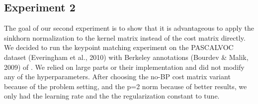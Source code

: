 \subsection{Experiment 2}

The goal of our second experiment is to show that it is advantageous to apply the sinkhorn normalization to the kernel matrix instead of the cost matrix directly. We decided to run the keypoint matching experiment on the PASCALVOC  dataset (Everingham et al., 2010) with Berkeley annotations (Bourdev \& Malik, 2009) of \cite{fey2020_update}. We relied on large parts or their implementation and did not modify any of the hyperparameters. After choosing the no-BP cost matrix variant because of the problem setting, and the p=2 norm because of better results, we only had the learning rate and the the regularization constant to tune.








\begin{table}[ht]
    \centering
    \caption{Hits@1 (\%) on the PASCALVOC dataset with Berkeley keypoint annotations}
\end{table}


